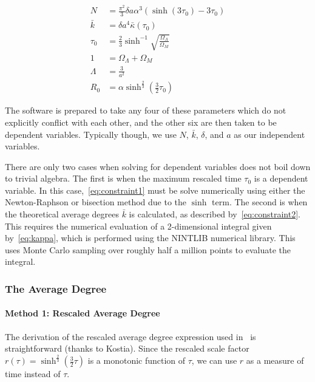 \documentclass[preprint,notitlepage,amsmath,amssymb,floatfix]{revtex4-1}
\begin{document}
\begin{align}
N &= \frac{\pi^2}{3}\delta a\alpha^3\left(\sinh\left(3\tau_0\right)-3\tau_0\right) \label{eq:constraint1} \\
\bar{k} &= \delta a^4\bar{\kappa}\left(\tau_0\right) \label{eq:constraint2} \\
\tau_0 &= \frac{2}{3}\sinh^{-1}\sqrt{\frac{\Omega_\Lambda}{\Omega_M}} \label{eq:constraint3} \\
1 &= \Omega_\Lambda + \Omega_M \label{eq:constraint4} \\
\Lambda &= \frac{3}{a^2} \label{eq:constraint5} \\
R_0 &= \alpha\sinh^{\frac{2}{3}}\left(\frac{3}{2}\tau_0\right) \label{eq:constraint6}
\end{align}

\noindent The software is prepared to take any four of these parameters which do not explicitly conflict with each other, and the other six are then taken to be dependent variables.  
Typically though, we use $N$, $\bar{k}$, $\delta$, and $a$ as our independent variables. \par
There are only two cases when solving for dependent variables does not boil down to trivial algebra.  
The first is when the maximum rescaled time $\tau_0$ is a dependent variable.  
In this case,~\eqref{eq:constraint1} must be solve numerically using either the Newton-Raphson or bisection method due to the $\sinh$ term.  
The second is when the theoretical average degrees $\bar{k}$ is calculated, as described by~\eqref{eq:constraint2}.  
This requires the numerical evaluation of a 2-dimensional integral given by~\eqref{eq:kappa}, which is performed using the NINTLIB numerical library.  
This uses Monte Carlo sampling over roughly half a million points to evaluate the integral. \par
\subsubsection{The Average Degree}
\paragraph{Method 1: Rescaled Average Degree}
The derivation of the rescaled average degree expression used in~\cite{ref:snc2012} is straightforward (thanks to Kostia).
Since the rescaled scale factor $r\left(\tau\right) = \sinh^{\frac{2}{3}}\left(\frac{3}{2}\tau\right)$ is a monotonic function of $\tau$, we can use $r$ as a measure of time instead of $\tau$.
\end{document}
